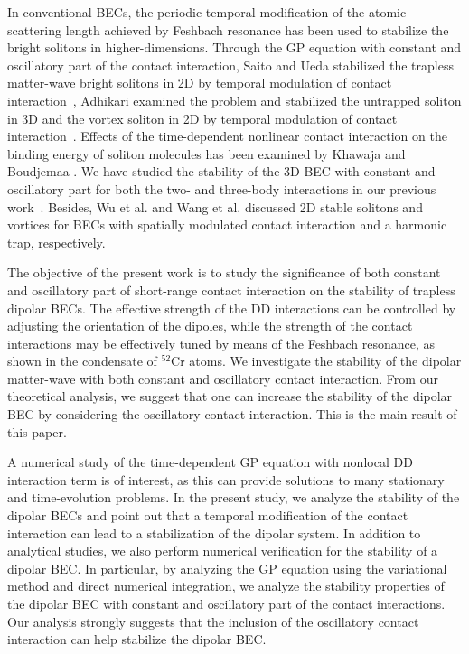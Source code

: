 \documentclass[amsmath,amssymb,article,twocolumn,superscriptaddress,showpacs,10pt]{revtex4-1}
\begin{document}
In conventional BECs, the periodic temporal modification of the atomic scattering length achieved by Feshbach resonance has been used to stabilize the bright solitons in higher-dimensions. Through the GP equation with constant and oscillatory part of the contact interaction, Saito and Ueda stabilized the trapless matter-wave bright solitons in 2D by temporal modulation of contact interaction~\cite{Saito:2003}, Adhikari examined the problem and stabilized the untrapped soliton in 3D and the vortex soliton in 2D by temporal modulation of contact interaction~\cite{Adhikari:2004}. Effects of the time-dependent nonlinear contact interaction on the binding energy of soliton molecules has been examined by Khawaja and Boudjemaa \cite{Khawaja:2012}. We have studied the stability of the 3D BEC with constant and oscillatory part for both the two- and three-body interactions in our previous work~\cite{Sabari:2010}. Besides, Wu et al. \cite{Wu:2010} and Wang et al. \cite{Wang:2010} discussed 2D stable solitons and vortices for BECs with spatially modulated contact interaction and a harmonic trap, respectively.


The objective of the present work is to study the significance of both constant and oscillatory part of short-range contact interaction on the stability of trapless dipolar BECs. The effective strength of the DD interactions can be controlled by adjusting the orientation of the dipoles, while the strength of the contact interactions may be effectively tuned by means of the Feshbach resonance, as shown in the condensate of $^{52}$Cr atoms. We investigate the stability of the dipolar matter-wave with both constant and oscillatory contact interaction. From our theoretical analysis, we suggest that one can increase the stability of the dipolar BEC by considering the oscillatory contact interaction. This is the main result of this paper. 

A numerical study of the time-dependent GP equation with nonlocal DD interaction term is of interest, as this can provide solutions to many stationary and time-evolution problems. In the present study, we analyze the stability of the dipolar BECs and point out that a temporal modification of the contact interaction can lead to a stabilization of the dipolar system. In addition to analytical studies, we also perform numerical verification for the stability of a dipolar BEC. In particular, by analyzing the GP equation using the variational method and direct numerical integration, we analyze the stability properties of the dipolar BEC with constant and oscillatory part of the contact interactions. Our analysis strongly suggests that the inclusion of the oscillatory contact interaction can help stabilize the dipolar BEC.
\end{document}
